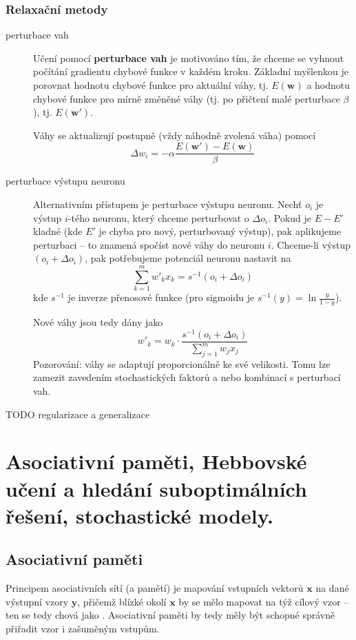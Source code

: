 \documentclass[11pt]{report} %
\renewcommand{\vec}[1]{\mathbf{#1}}
\numberwithin{equation}{section}
\begin{document}
\subsubsection{Relaxační metody}
\begin{description}
	
	
	\item[perturbace vah] Učení pomocí \textbf{perturbace vah} je motivováno tím, že chceme se vyhnout počítání gradientu chybové funkce v každém kroku. Základní myšlenkou je porovnat hodnotu chybové funkce pro aktuální váhy, tj. $E(\vec{w})$ a hodnotu chybové funkce pro mírně změněné váhy (tj. po přičtení malé perturbace $\beta$), tj. $E(\vec{w'})$.
	
	Váhy se aktualizují postupně (vždy náhodně zvolená váha) pomocí
	$$\Delta w_i = - \alpha \frac{E(\vec{w'}) - E(\vec{w})}{\beta}$$ 
	
	\item[perturbace výstupu neuronu] 
	Alternativním přístupem je perturbace výstupu neuronu. Nechť $o_i$ je výstup $i$-tého neuronu, který chceme perturbovat o $\Delta o_i$. Pokud je $E - E'$ kladné (kde $E'$ je chyba pro nový, perturbovaný výstup), pak aplikujeme perturbaci -- to znamená spočíst nové váhy do neuronu $i$. Chceme-li výstup $(o_i + \Delta o_i)$, pak potřebujeme potenciál neuronu nastavit na 
	$$\sum\limits_{k=1}^{m} w'_k x_k = s^{-1}(o_i + \Delta o_i)$$
	kde $s^{-1}$ je inverze přenosové funkce (pro sigmoidu je $s^{-1}(y) = \ln \frac{y}{1-y}$).
	
	Nové váhy jsou tedy dány jako 
	$$
	w'_k = w_k \cdot \frac{s^{-1}(o_i + \Delta o_i)}{\sum\limits_{j=1}^{m} w_j x_j}
	$$
	Pozorování: váhy se adaptují proporcionálně ke své velikosti. Tomu lze zamezit zavedením stochastických faktorů a nebo kombinací s perturbací vah.
	
\end{description}


TODO regularizace a generalizace




\section{Asociativní paměti, Hebbovské učení a hledání suboptimálních řešení, stochastické modely.}
\subsection{Asociativní paměti}

Principem asociativních sítí (a pamětí) je mapování vstupních vektorů $\vec{x}$ na dané výstupní vzory $\vec{y}$, přičemž blízké okolí $\vec{x}$ by se mělo mapovat na týž cílový vzor -- ten se tedy chová jako . Asociativní paměti by tedy měly být schopné správně přiřadit vzor i zašuměným vstupům. 
\end{document}

